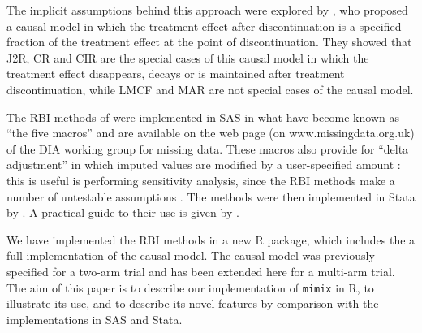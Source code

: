 The implicit assumptions behind this approach were explored by \citet{ian:RBIcausal}, who proposed a causal model in which the treatment effect after discontinuation is a specified fraction of the treatment effect at the point of discontinuation. They showed that J2R, CR and CIR are the special cases of this causal model in which the treatment effect disappears, decays or is maintained after treatment discontinuation, while LMCF and MAR are not special cases of the causal model. 

The RBI methods of \citet{Carpenter++13} were implemented in SAS in what have become known as ``the five macros'' and are available on the web page (on www.missingdata.org.uk) of the DIA working group for missing data. These macros also provide for ``delta adjustment'' in which imputed values are modified by a user-specified amount \citep{Ratitch++13}: this is useful is performing sensitivity analysis, since the RBI methods make a number of untestable assumptions \citep{ian:ZAMSTAR}.
The methods were then implemented in Stata by \citet{Cro++16}.
A practical guide to their use is given by \citet{Cro++20}.

We have implemented the RBI methods in a new R package, which includes the a full implementation of the causal model. 
The causal model was previously specified for a two-arm trial and has been extended here for a multi-arm trial.
The aim of this paper is to describe our implementation of \texttt{mimix} in R, to illustrate its use, and to describe its novel features by comparison with the implementations in SAS and Stata.

%
%

%
%

